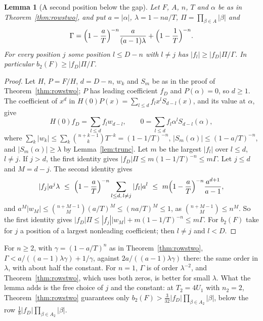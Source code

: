 \documentclass[11pt]{article}
\newtheorem{lemma}[theorem]{Lemma}
\begin{document}
\begin{lemma}[A second position below the gap]\label{lem:twobelow}
Let $F$, $A$, $n$, $T$ and $\alpha$ be as in Theorem~\ref{thm:rowstwo}, and
put $a=|\alpha|$, $\lambda=1-na/T$, $\Pi=\prod_{\beta\in A}|\beta|$ and
\[
  \Gamma=\Bigl(1-\frac aT\Bigr)^{-n}\frac a{(a-1)\lambda}+\Bigl(1-\frac1T\Bigr)^{-n}.
\]
For every position $j$ some position $l\le D-n$ with $l\ne j$ has
$|f_l|\ge|f_D|\Pi/\Gamma$.  In particular $b_2(F)\ge|f_D|\Pi/\Gamma$.
\end{lemma}

\begin{proof}
Let $H$, $P=F/H$, $d=D-n$, $w_k$ and $S_m$ be as in the proof of
Theorem~\ref{thm:rowstwo}; $P$ has leading coefficient $f_D$ and
$P(\alpha)=0$, so $d\ge1$.  The coefficient of $x^d$ in
$H(0)P(x)=\sum_{l\le d}f_lx^lS_{d-l}(x)$, and its value at $\alpha$, give
\[
  H(0)f_D=\sum_{l\le d}f_lw_{d-l},\qquad0=\sum_{l\le d}f_l\alpha^lS_{d-l}(\alpha),
\]
where $\sum_k|w_k|\le\sum_k\binom{n+k-1}kT^{-k}=(1-1/T)^{-n}$,
$|S_m(\alpha)|\le(1-a/T)^{-n}$, and $|S_m(\alpha)|\ge\lambda$ by
Lemma~\ref{lem:trunc}.  Let $m$ be the largest $|f_l|$ over $l\le d$,
$l\ne j$.  If $j>d$, the first identity gives
$|f_D|\Pi\le m(1-1/T)^{-n}\le m\Gamma$.  Let $j\le d$ and $M=d-j$.  The
second identity gives
\[
  |f_j|a^j\lambda\ \le\ \Bigl(1-\frac aT\Bigr)^{-n}\sum_{l\le d,\,l\ne j}|f_l|a^l
  \ \le\ m\Bigl(1-\frac aT\Bigr)^{-n}\frac{a^{d+1}}{a-1},
\]
and $a^M|w_M|\le\binom{n+M-1}M(a/T)^M\le(na/T)^M\le1$, as
$\binom{n+M-1}M\le n^M$.  So the first identity gives
$|f_D|\Pi\le|f_j||w_M|+m(1-1/T)^{-n}\le m\Gamma$.  For $b_2(F)$ take for
$j$ a position of a largest nonleading coefficient; then $l\ne j$ and
$l<D$.
\end{proof}

For $n\ge2$, with $\gamma=(1-a/T)^n$ as in Theorem~\ref{thm:rowstwo},
$\Gamma<a/((a-1)\lambda\gamma)+1/\gamma$, against $2a/((a-1)\lambda\gamma)$
there: the same order in $\lambda$, with about half the constant.  For $n=1$,
$\Gamma$ is of order $\lambda^{-2}$, and Theorem~\ref{thm:rowstwo}, which
uses both zeros, is better for small $\lambda$.  What the lemma adds is the
free choice of $j$ and the constant: at $T_2=4U_1$ with $n_2=2$,
Theorem~\ref{thm:rowstwo} guarantees only
$b_2(F)>\frac{3}{32}|f_D|\prod_{\beta\in A_2}|\beta|$, below the row
$\frac18|f_D|\prod_{\beta\in A_2}|\beta|$.
\end{document}
